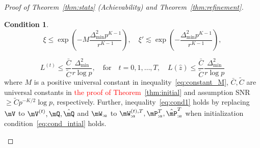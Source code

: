 \documentclass[lettersize,onecolumn,journal]{IEEEtran}
\theoremstyle{definition}
\theoremstyle{definition}
\newtheorem{condition}{Condition}
\newcommand{\of}[1]{\left(#1\right)}
\begin{document}
\begin{proof}[Proof of Theorem~\ref{thm:stats} (Achievability) and Theorem~\ref{thm:refinement}]
{\begin{condition}
\begin{equation}\label{eq:cond_oracle}
    \xi \leq \exp\of{ - M \frac{\Delta_{\min}^2 p^{K-1}}{r^{K-1}}}, \quad  \xi' \lesssim \exp\of{ -  \frac{\Delta_{\min}^2 p^{K-1}}{r^{K-1}}},
\end{equation}

\begin{equation}\label{eq:cond_intial}
    L^{(t)} \leq \frac{\bar C}{\tilde C} \frac{\Delta_{\min}^2}{r \log p}, \quad \text{for} \quad t = 0, 1, \ldots, T, \quad  L(\hat z) \leq \frac{\bar C}{\tilde C} \frac{\Delta_{\min}^2}{r \log p}
\end{equation}
where $M$ is a positive universal constant in inequality~\eqref{eq:constant_M}, $\bar C, \tilde C$ are universal constants in \textcolor{red}{the proof of Theorem~\ref{thm:initial}} and assumption SNR $\geq \tilde C p^{-K/2} \log p$, respectively. Further, inequality~\eqref{eq:cond1} holds by replacing $\mV$ to $\mV^{(t)}, \mQ, \hat \mQ$ and $\mW_{:a}$ to $\mW_{:a}^{(t),T}, \mP_{:a}^T, \hat \mP_{:a}^T$ when initialization condition~\eqref{eq:cond_intial} holds.
\end{condition}



}


\end{proof}
\end{document}
